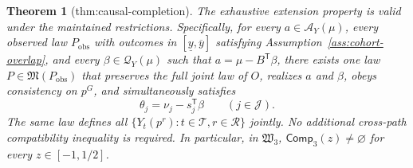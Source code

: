 \documentclass{article}
\newtheorem{theorem}{Theorem}
\begin{document}
\begin{theorem}[thm:causal-completion]\label{thm:causal-completion}
The exhaustive extension property is valid under the maintained restrictions.  Specifically, for every \(a\in\mathcal A_Y(\mu)\), every observed law \(P_{\mathrm{obs}}\) with outcomes in \([\underline y,\overline y]\) satisfying Assumption~\ref{ass:cohort-overlap}, and every \(\beta\in\mathcal Q_Y(\mu)\) such that \(a=\mu-B^{\mathsf T}\beta\), there exists one law \(P\in\mathfrak M(P_{\mathrm{obs}})\) that preserves the full joint law of \(O\), realizes \(a\) and \(\beta\), obeys consistency on \(p^G\), and simultaneously satisfies
\[
 \theta_j=\nu_j-s_j^{\mathsf T}\beta
 \qquad(j\in\mathcal J).
\]
The same law defines all \(\{Y_t(p^r):t\in\mathcal T,r\in\mathcal R\}\) jointly.  No additional cross-path compatibility inequality is required.  In particular, in \(\mathfrak W_3\), \(\mathsf{Comp}_3(z)\ne\varnothing\) for every \(z\in[-1,1/2]\).
\end{theorem}
\end{document}
